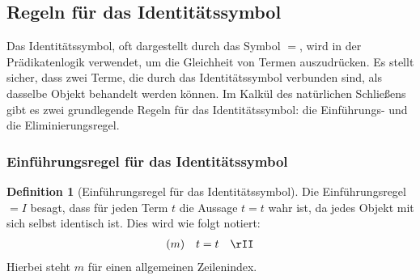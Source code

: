\documentclass{book}
\theoremstyle{plain}
\theoremstyle{remark}
\theoremstyle{definition}
\newtheorem{definition}{Definition}[section]
\begin{document}
\subsection{Regeln für das Identitätssymbol}


Das Identitätssymbol, oft dargestellt durch das Symbol \(=\), wird in der Prädikatenlogik verwendet, um die Gleichheit von Termen auszudrücken. Es stellt sicher, dass zwei Terme, die durch das Identitätssymbol verbunden sind, als dasselbe Objekt behandelt werden können. Im Kalkül des natürlichen Schließens gibt es zwei grundlegende Regeln für das Identitätssymbol: die Einführungs- und die Eliminierungsregel.

\subsubsection{Einführungsregel für das Identitätssymbol}
\label{rule:II} 
\begin{definition}[Einführungsregel für das Identitätssymbol]
Die Einführungsregel \(=I\) besagt, dass für jeden Term \(t\) die Aussage \(t = t\) wahr ist, da jedes Objekt mit sich selbst identisch ist. Dies wird wie folgt notiert:
\[
\begin{array}{lll}
    (m) & t = t & \rII \\
\end{array}
\]
Hierbei steht \(m\) für einen allgemeinen Zeilenindex.
\end{definition}
\end{document}
